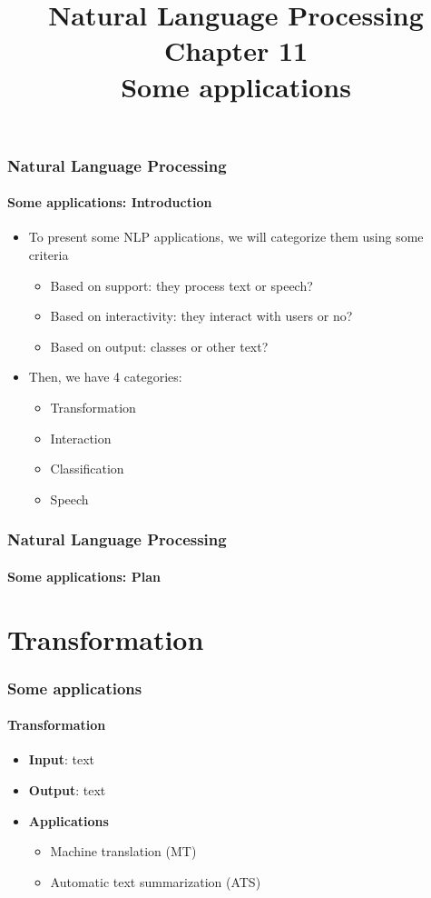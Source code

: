\documentclass[xcolor=table]{beamer}
\title[ESI - NLP: 11- Some applications]%
{Natural Language Processing\\Chapter 11\\Some applications}
\begin{document}
	
\begin{frame}
\frametitle{Natural Language Processing}
\framesubtitle{Some applications: Introduction}

	\begin{itemize}
		\item To present some NLP applications, we will categorize them using some criteria
		\begin{itemize}
			\item Based on support: they process text or speech?
			\item Based on interactivity: they interact with users or no?
			\item Based on output: classes or other text?
		\end{itemize}
		\item Then, we have 4 categories:
		\begin{itemize}
			\item Transformation
			\item Interaction
			\item Classification
			\item Speech
		\end{itemize}
	\end{itemize}

\end{frame}

\begin{frame}
\frametitle{Natural Language Processing}
\framesubtitle{Some applications: Plan}

\begin{multicols}{2}
\tableofcontents
\end{multicols}
\end{frame}

\section{Transformation}

\begin{frame}
	\frametitle{Some applications}
	\framesubtitle{Transformation}
	\begin{itemize}
		\item \textbf{Input}: text 
		\item \textbf{Output}: text
		\item \textbf{Applications} 
		\begin{itemize}
			\item Machine translation (MT)
			\item Automatic text summarization (ATS)
		\end{itemize}
	\end{itemize}
\end{frame}
\end{document}
